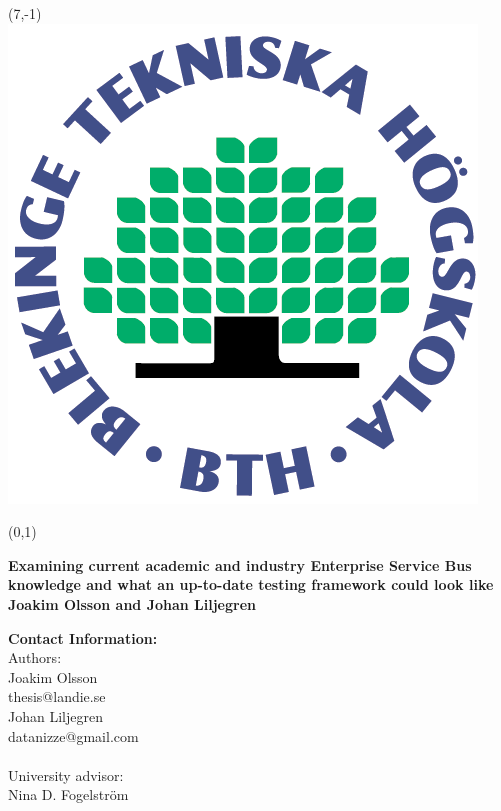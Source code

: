 \pagestyle{fancy}
\cfoot{}
\renewcommand{\headrulewidth}{0pt}
\renewcommand{\footrulewidth}{0pt}

\begin{textblock}{5}(7,-1)
	\includegraphics{img/bth_logo.png}
\end{textblock}

\begin{textblock}{9}(0,1)
\vspace*{2cm}
\begin{center} 
	{\bf\fontsize{24}{30}\selectfont Examining current academic and industry Enterprise Service Bus knowledge and what an up-to-date testing framework could look like} \\[3cm]
	{\bf\fontsize{16}{20}\selectfont Joakim Olsson and Johan Liljegren} \\[2cm]
\end{center}

{\noindent\bf Contact Information:} \\
Authors: \\
Joakim Olsson \\
thesis@landie.se\\
Johan Liljegren \\
datanizze@gmail.com \\ \\

\noindent University advisor: \\
Nina D. Fogelström
\end{textblock}
